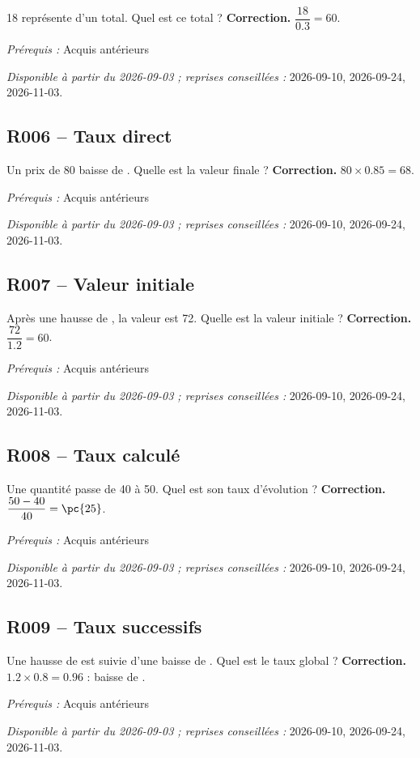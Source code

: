 18 représente  d’un total. Quel est ce total ?
\ifmxteacher\textbf{Correction.} $\dfrac{18}{\num{0,3}}=60$.\par\textit{Prérequis :} Acquis antérieurs\par\textit{Disponible à partir du 2026-09-03 ; reprises conseillées :} 2026-09-10, 2026-09-24, 2026-11-03.\fi
{}\subsection*{R006 -- Taux direct}\label{R006}
Un prix de 80 baisse de . Quelle est la valeur finale ?
\ifmxteacher\textbf{Correction.} $80\times\num{0,85}=68$.\par\textit{Prérequis :} Acquis antérieurs\par\textit{Disponible à partir du 2026-09-03 ; reprises conseillées :} 2026-09-10, 2026-09-24, 2026-11-03.\fi
{}\subsection*{R007 -- Valeur initiale}\label{R007}
Après une hausse de , la valeur est 72. Quelle est la valeur initiale ?
\ifmxteacher\textbf{Correction.} $\dfrac{72}{\num{1,2}}=60$.\par\textit{Prérequis :} Acquis antérieurs\par\textit{Disponible à partir du 2026-09-03 ; reprises conseillées :} 2026-09-10, 2026-09-24, 2026-11-03.\fi
{}\subsection*{R008 -- Taux calculé}\label{R008}
Une quantité passe de 40 à 50. Quel est son taux d’évolution ?
\ifmxteacher\textbf{Correction.} $\dfrac{50-40}{40}=\pc{25}$.\par\textit{Prérequis :} Acquis antérieurs\par\textit{Disponible à partir du 2026-09-03 ; reprises conseillées :} 2026-09-10, 2026-09-24, 2026-11-03.\fi
{}\subsection*{R009 -- Taux successifs}\label{R009}
Une hausse de  est suivie d’une baisse de . Quel est le taux global ?
\ifmxteacher\textbf{Correction.} $\num{1,2}\times\num{0,8}=\num{0,96}$ : baisse de .\par\textit{Prérequis :} Acquis antérieurs\par\textit{Disponible à partir du 2026-09-03 ; reprises conseillées :} 2026-09-10, 2026-09-24, 2026-11-03.\fi
